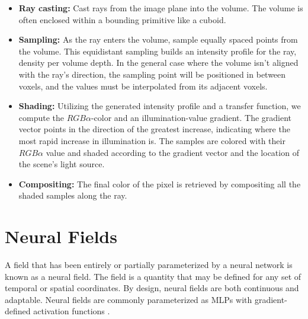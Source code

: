 \begin{itemize}
    \item \textbf{Ray casting:} Cast rays from the image plane into the volume. The volume is often enclosed within a bounding primitive like a cuboid.
    \item \textbf{Sampling:} As the ray enters the volume, sample equally spaced points from the volume. This equidistant sampling builds an intensity profile for the ray, density per volume depth. In the general case where the volume isn't aligned with the ray's direction, the sampling point will be positioned in between voxels, and the values must be interpolated from its adjacent voxels.
    \item \textbf{Shading:} Utilizing the generated intensity profile and a transfer function, we compute the $RGB\alpha$-color and an illumination-value gradient. The gradient vector points in the direction of the greatest increase, indicating where the most rapid increase in illumination is. The samples are colored with their $RGB\alpha$ value and shaded according to the gradient vector and the location of the scene's light source.
    \item \textbf{Compositing:} The final color of the pixel is retrieved by compositing all the shaded samples along the ray. 
\end{itemize}



\begin{comment}
\subsection{Alpha compositing}
Alpha compositing is the process of combining one image with a background to create the appearance of partial or full transparency \cite{wiki:Alpha_compositing}.

\subsection{Ray marching}
\end{comment}



\section{Neural Fields} %
A field that has been entirely or partially parameterized by a neural network is known as a neural field. The field is a quantity that may be defined for any set of temporal or spatial coordinates. By design, neural fields are both continuous and adaptable. Neural fields are commonly parameterized as MLPs with gradient-defined activation functions \cite{xie_neural_2022}.

